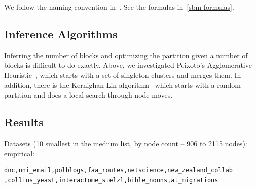 \documentclass[aps,pre,superscriptaddress]{article}
\begin{document}
We follow the naming convention in~\cite{funke19-04}.
See the formulas in~\ref{sbm-formulas}.

\subsection{Inference Algorithms}

Inferring the number of blocks and optimizing the partition given a number of blocks is difficult to do exactly.
Above, we investigated Peixoto's Agglomerative Heuristic~\cite{peixoto14-01}, which starts with a set of singleton clusters and merges them.
In addition, there is the Kernighan-Lin algorithm~\cite{kernighan70-02} which starts with a random partition and does a local search through node moves.

\subsection{Results}

Datasets (10 smallest in the medium list, by node count -- 906 to 2115 nodes):
empirical:
\begin{verbatim}
dnc,uni_email,polblogs,faa_routes,netscience,new_zealand_collab
,collins_yeast,interactome_stelzl,bible_nouns,at_migrations    
\end{verbatim}
\end{document}

